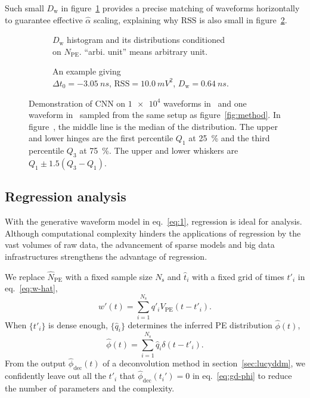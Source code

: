 Such small $D_\mathrm{w}$ in figure~\ref{fig:cnn-npe} provides a precise matching of waveforms horizontally to guarantee effective $\hat{\alpha}$ scaling, explaining why $\mathrm{RSS}$ is also small in figure~\ref{fig:cnn}.

\begin{figure}[H]
  \begin{subfigure}{.5\textwidth}
    \centering
    \resizebox{\textwidth}{!}{}
    \caption{\label{fig:cnn-npe} $D_\mathrm{w}$ histogram and its distributions conditioned \\ on $N_{\mathrm{PE}}$. ``arbi. unit'' means arbitrary unit.}
  \end{subfigure}
  \begin{subfigure}{.5\textwidth}
    \centering
    \resizebox{\textwidth}{!}{}
    \caption{\label{fig:cnn}An example giving \\ $\Delta t_0=\SI{-3.05}{ns}$, $\mathrm{RSS}=\SI{10.0}{mV^2}$, $D_\mathrm{w}=\SI{0.64}{ns}$.}
  \end{subfigure}
  \caption{\label{fig:cnn-performance}Demonstration of CNN on $\num[retain-unity-mantissa=false]{1e4}$ waveforms in~ and one waveform in~ sampled from the same setup as figure~\ref{fig:method}.  In figure~, the middle line is the median of the distribution. The upper and lower hinges are the first percentile $Q_1$ at \SI{25}{\percent} and the third percentile $Q_3$ at \SI{75}{\percent}. The upper and lower whiskers are $Q_1 \pm 1.5(Q_3-Q_1)$. }
\end{figure}

\subsection{Regression analysis}
\label{sec:regression}
With the generative waveform model in eq.~\eqref{eq:1}, regression is ideal for analysis. Although computational complexity hinders the applications of regression by the vast volumes of raw data, the advancement of sparse models and big data infrastructures strengthens the advantage of regression.

We replace $\hat{N}_\mathrm{PE}$ with a fixed sample size $N_\mathrm{s}$ and $\hat{t}_i$ with a fixed grid of times $t'_i$ in eq.~\eqref{eq:w-hat}, 
\begin{equation}
  \label{eq:gd}
  w'(t) = \sum_{i=1}^{N_\mathrm{s}}q'_iV_\mathrm{PE}(t-t'_i).
\end{equation}
When $\{t'_i\}$ is dense enough, $\{\hat{q}_i\}$ determines the inferred PE distribution $\hat{\phi}(t)$,
\begin{equation}
  \label{eq:gd-phi}
  \hat{\phi}(t) = \sum_{i=1}^{N_\mathrm{s}}\hat{q}_i\delta(t-t'_i).
\end{equation}
From the output $\hat{\phi}_\mathrm{dec}(t)$ of a deconvolution method in section~\ref{sec:lucyddm}, we confidently leave out all the $t'_i$ that $\hat{\phi}_\mathrm{dec}(t_i')=0$ in eq.~\eqref{eq:gd-phi} to reduce the number of parameters and the complexity.


